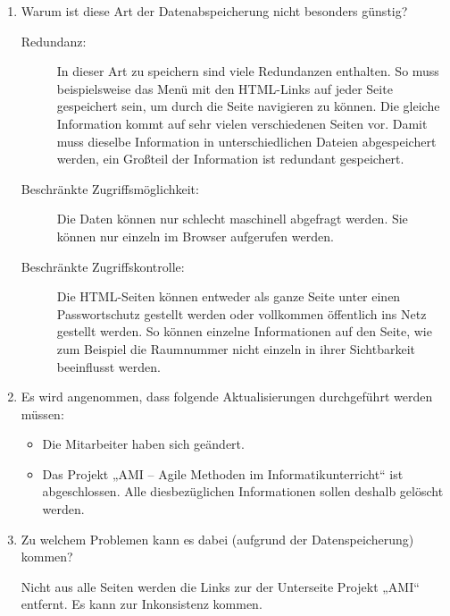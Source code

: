 \documentclass{bschlangaul-aufgabe}
\begin{document}
\begin{enumerate}


\item Warum ist diese Art der Datenabspeicherung nicht besonders
günstig?

\begin{bAntwort}
\begin{description}
\item[Redundanz:]

In dieser Art zu speichern sind viele Redundanzen enthalten. So muss
beispielsweise das Menü mit den HTML-Links auf jeder Seite gespeichert
sein, um durch die Seite navigieren zu können. Die gleiche Information
kommt auf sehr vielen verschiedenen Seiten vor. Damit muss dieselbe
Information in unterschiedlichen Dateien abgespeichert werden, \dh ein
Großteil der Information ist redundant gespeichert.

\item[Beschränkte Zugriffsmöglichkeit:]

Die Daten können nur schlecht maschinell abgefragt werden. Sie können
nur einzeln im Browser aufgerufen werden.

\item[Beschränkte Zugriffskontrolle:]

Die HTML-Seiten können entweder als ganze Seite unter einen
Passwortschutz gestellt werden oder vollkommen öffentlich ins Netz
gestellt werden. So können einzelne Informationen auf den Seite, wie
zum Beispiel die Raumnummer nicht einzeln in ihrer Sichtbarkeit
beeinflusst werden.
\end{description}
\end{bAntwort}


\item Es wird angenommen, dass folgende Aktualisierungen durchgeführt
werden müssen:

\begin{itemize}
\item Die Mitarbeiter haben sich geändert.
\item Das Projekt „AMI – Agile Methoden im Informatikunterricht“ ist
abgeschlossen. Alle diesbezüglichen Informationen sollen deshalb
gelöscht werden.
\end{itemize}

\item Zu welchem Problemen kann es dabei (aufgrund der Datenspeicherung)
kommen?

\begin{bAntwort}
Nicht aus alle Seiten werden die Links zur der Unterseite Projekt „AMI“
entfernt. Es kann zur Inkonsistenz kommen.


\end{bAntwort}
\end{enumerate}
\end{document}
